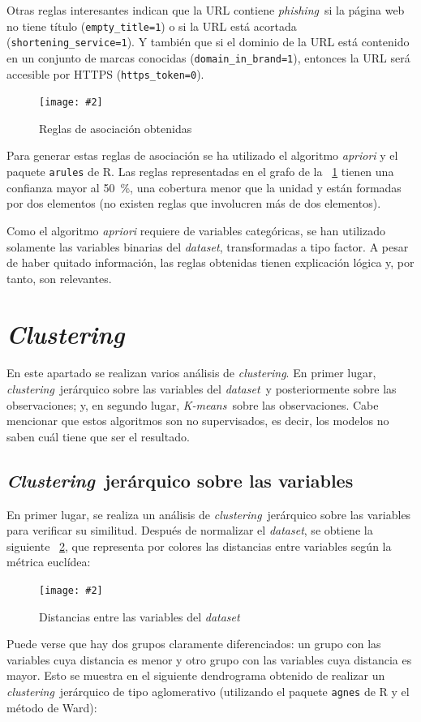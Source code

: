 \documentclass[12pt, a4paper]{article}
\renewcommand{\textit}{\textsl}
\newcommand*{\figref}[1]{\figurename~\ref{fig:#1}}
\newcommand{\figcaption}[4][H]{
  \begin{figure}[#1]
    \centering
    \texttt{[image: \#2]}
    \caption{#3}
    \label{fig:#2}
  \end{figure}
}
\newcommand*{\clustering}{\textit{clustering}}
\newcommand*{\Clustering}{\textit{Clustering}}
\newcommand*{\dataset}{\textit{dataset}}
\newcommand*{\kmeans}{\textit{K-means}}
\newcommand*{\phishing}{\textit{phishing}}
\begin{document}
    Otras reglas interesantes indican que la URL contiene \phishing\ si la página web no tiene título (\texttt{empty\_title=1}) o si la URL está acortada (\texttt{shortening\_service=1}). Y también que si el dominio de la URL está contenido en un conjunto de marcas conocidas (\texttt{domain\_in\_brand=1}), entonces la URL será accesible por HTTPS (\texttt{https\_token=0}).

    \figcaption{rules.png}{Reglas de asociación obtenidas}{1}

    Para generar estas reglas de asociación se ha utilizado el algoritmo \textit{apriori} y el paquete \texttt{arules} de R. Las reglas representadas en el grafo de la \figref{rules.png} tienen una confianza mayor al \SI{50}{\percent}, una cobertura menor que la unidad y están formadas por dos elementos (no existen reglas que involucren más de dos elementos).

    Como el algoritmo \textit{apriori} requiere de variables categóricas, se han utilizado solamente las variables binarias del \dataset, transformadas a tipo factor. A pesar de haber quitado información, las reglas obtenidas tienen explicación lógica y, por tanto, son relevantes.

  \section{\Clustering}

    En este apartado se realizan varios análisis de \clustering. En primer lugar, \clustering\ jerárquico sobre las variables del \dataset\ y posteriormente sobre las observaciones; y, en segundo lugar, \kmeans\ sobre las observaciones. Cabe mencionar que estos algoritmos son no supervisados, es decir, los modelos no saben cuál tiene que ser el resultado.

    \subsection{\Clustering\ jerárquico sobre las variables}

      En primer lugar, se realiza un análisis de \clustering\ jerárquico sobre las variables para verificar su similitud. Después de normalizar el \dataset, se obtiene la siguiente \figref{dist_var.png}, que representa por colores las distancias entre variables según la métrica euclídea:

      \figcaption{dist_var.png}{Distancias entre las variables del \dataset}{1}

      Puede verse que hay dos grupos claramente diferenciados: un grupo con las variables cuya distancia es menor y otro grupo con las variables cuya distancia es mayor. Esto se muestra en el siguiente dendrograma obtenido de realizar un \clustering\ jerárquico de tipo aglomerativo (utilizando el paquete \texttt{agnes} de R y el método de Ward):
\end{document}
